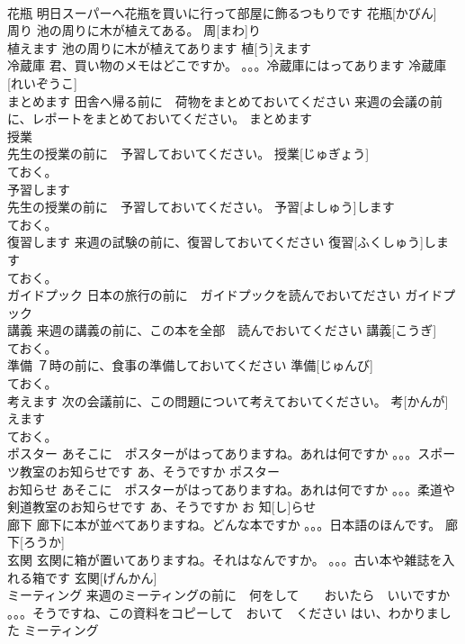 \documentclass[8pt]{extreport}
\begin{document}
\begin{CJK}{UTF8}{min}
\\	花瓶	明日スーパーへ花瓶を買いに行って部屋に飾るつもりです	花瓶[かびん]					
\\	周り	池の周りに木が植えてある。	周[まわ]り					
\\	植えます	池の周りに木が植えてあります	植[う]えます					
\\	冷蔵庫	君、買い物のメモはどこですか。 。。。冷蔵庫にはってあります	冷蔵庫[れいぞうこ]					
\\	まとめます	田舎へ帰る前に　荷物をまとめておいてください 来週の会議の前に、レポートをまとめておいてください。	まとめます			
\\	授業	
\\	先生の授業の前に　予習しておいてください。	授業[じゅぎょう]				
\\	ておく。
\\	予習します	
\\	先生の授業の前に　予習しておいてください。	予習[よしゅう]します			
\\	ておく。
\\	復習します	来週の試験の前に、復習しておいてください	復習[ふくしゅう]します				
\\	ておく。
\\	ガイドプック	日本の旅行の前に　ガイドプックを読んでおいてださい	ガイドプック					
\\	講義	来週の講義の前に、この本を全部　読んでおいてください	講義[こうぎ]				
\\	ておく。
\\	準備	７時の前に、食事の準備しておいてください	準備[じゅんび]				
\\	ておく。
\\	考えます	次の会議前に、この問題について考えておいてください。	考[かんが]えます				
\\	ておく。
\\	ポスター	あそこに　ポスターがはってありますね。あれは何ですか 。。。スポーツ教室のお知らせです あ、そうですか	ポスター					
\\	お知らせ	あそこに　ポスターがはってありますね。あれは何ですか 。。。柔道や　剣道教室のお知らせです あ、そうですか	お 知[し]らせ					
\\	廊下	廊下に本が並べてありますね。どんな本ですか 。。。日本語のほんです。	廊下[ろうか]			
\\	玄関	玄関に箱が置いてありますね。それはなんですか。 。。。古い本や雑誌を入れる箱です	玄関[げんかん]					
\\	ミーティング	来週のミーティングの前に　何をして　　おいたら　いいですか 。。。そうですね、この資料をコピーして　おいて　ください はい、わかりました	ミーティング					

\end{CJK}
\end{document}
